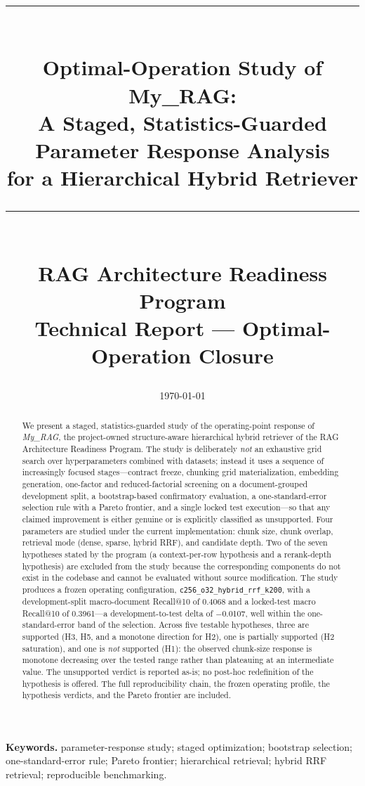 \documentclass[11pt,a4paper]{article}
\title{
  \vspace{-1.5cm}
  \rule{\linewidth}{0.4pt}\\[0.3cm]
  {\Large\bfseries Optimal-Operation Study of My\_RAG:}\\[0.15cm]
  {\large A Staged, Statistics-Guarded Parameter Response Analysis\\ for a Hierarchical Hybrid Retriever}\\[0.2cm]
  \rule{\linewidth}{0.4pt}\\[0.4cm]
  \normalsize RAG Architecture Readiness Program\\
  \small Technical Report --- Optimal-Operation Closure
}
\author{}
\date{\today}
\begin{document}
\maketitle
\thispagestyle{empty}

\begin{abstract}
\noindent
We present a staged, statistics-guarded study of the operating-point
response of \emph{My\_RAG}, the project-owned structure-aware
hierarchical hybrid retriever of the RAG Architecture Readiness
Program. The study is deliberately \emph{not} an exhaustive grid
search over hyperparameters combined with datasets; instead it uses
a sequence of increasingly focused stages---contract freeze,
chunking grid materialization, embedding generation, one-factor and
reduced-factorial screening on a document-grouped development split,
a bootstrap-based confirmatory evaluation, a one-standard-error
selection rule with a Pareto frontier, and a single locked test
execution---so that any claimed improvement is either genuine or is
explicitly classified as unsupported. Four parameters are studied
under the current implementation: chunk size, chunk overlap,
retrieval mode (dense, sparse, hybrid RRF), and candidate depth.
Two of the seven hypotheses stated by the program (a context-per-row
hypothesis and a rerank-depth hypothesis) are excluded from the study
because the corresponding components do not exist in the codebase and
cannot be evaluated without source modification. The study produces a
frozen operating configuration,
\texttt{c256\_o32\_hybrid\_rrf\_k200}, with a development-split
macro-document Recall@10 of \num{0.4068} and a locked-test macro
Recall@10 of \num{0.3961}---a development-to-test delta of
\num{-0.0107}, well within the one-standard-error band of the
selection. Across five testable hypotheses, three are supported
(H3, H5, and a monotone direction for H2), one is partially supported
(H2 saturation), and one is \emph{not} supported (H1): the observed
chunk-size response is monotone decreasing over the tested range
rather than plateauing at an intermediate value. The unsupported
verdict is reported as-is; no post-hoc redefinition of the hypothesis
is offered. The full reproducibility chain, the frozen operating
profile, the hypothesis verdicts, and the Pareto frontier are
included.
\end{abstract}

\vfill
\noindent\textbf{Keywords.} parameter-response study; staged
optimization; bootstrap selection; one-standard-error rule; Pareto
frontier; hierarchical retrieval; hybrid RRF retrieval; reproducible
benchmarking.
\end{document}

